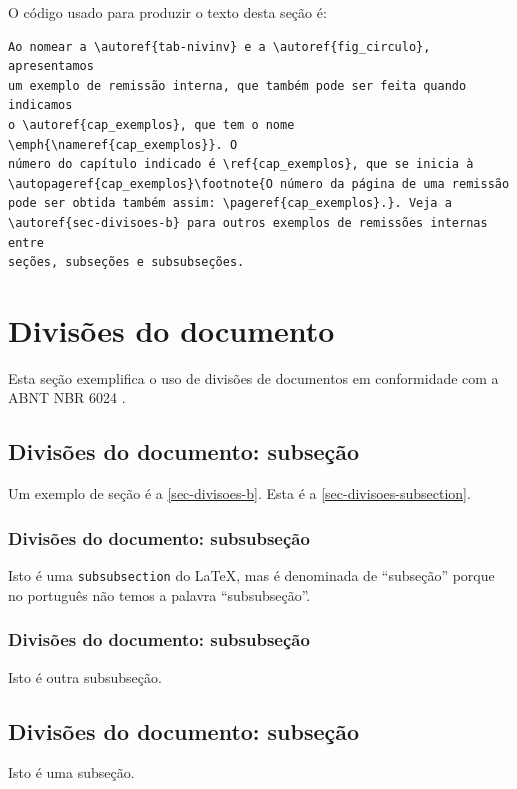 O código usado para produzir o texto desta seção é:

\begin{verbatim}
Ao nomear a \autoref{tab-nivinv} e a \autoref{fig_circulo}, apresentamos 
um exemplo de remissão interna, que também pode ser feita quando indicamos 
o \autoref{cap_exemplos}, que tem o nome \emph{\nameref{cap_exemplos}}. O
número do capítulo indicado é \ref{cap_exemplos}, que se inicia à 
\autopageref{cap_exemplos}\footnote{O número da página de uma remissão 
pode ser obtida também assim: \pageref{cap_exemplos}.}. Veja a 
\autoref{sec-divisoes-b} para outros exemplos de remissões internas entre 
seções, subseções e subsubseções.
\end{verbatim}

\section{Divisões do documento}\label{sec-divisoes-b}
Esta seção exemplifica o uso de divisões de documentos em conformidade com a ABNT NBR 6024  \cite{nbr6024}.
\subsection{Divisões do documento: subseção}\label{sec-divisoes-subsection}

Um exemplo de seção é a \autoref{sec-divisoes-b}. Esta é a \autoref{sec-divisoes-subsection}.

\subsubsection{Divisões do documento: subsubseção}\label{sec-divisoes-subsubsection}

Isto é uma \texttt{subsubsection} do \LaTeX, mas é denominada de ``subseção'' porque no português não temos a palavra ``subsubseção''.

\subsubsection{Divisões do documento: subsubseção}

Isto é outra subsubseção.

\subsection{Divisões do documento: subseção}\label{sec-exemplo-subsec}

Isto é uma subseção.


